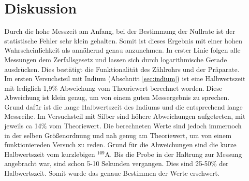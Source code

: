 \section{Diskussion}
\label{sec:Diskussion}
Durch die hohe Messzeit am Anfang, bei der Bestimmung der Nullrate ist der statistische Fehler sehr klein gehalten.
Somit ist dieses Ergebnis mit einer hohen Wahrscheinlichkeit als annähernd genau anzunehmen.
In erster Linie folgen alle Messungen dem Zerfallsgesetz und lassen sich durch logarithmische Gerade ausdrücken.
Dies bestätigt die Funktionalität des Zählrohrs und der Präparate.
Im ersten Versuchsteil mit Indium (Abschnitt \ref{sec:indium}) ist eine Halbwertszeit mit lediglich 1,9\% Abweichung vom Theoriewert berechnet worden.
Diese Abweichung ist klein genug, um von einem guten Messergebnis zu sprechen.
Grund dafür ist die lange Halbwertszeit des Indiums und die entsprechend lange Messreihe.
Im Versuchsteil mit Silber sind höhere Abweichungen aufgetreten, mit jeweils ca 14\% vom Theoriewert.
Die berechneten Werte sind jedoch immernoch in der selben Größenordnung und nah genug am Theoriewert, um von einem funktioniereden Versuch zu reden.
Grund für die Abweichungen sind die kurze Halbwertszeit vom kurzlebigen $^{109}$A.
Bis die Probe in der Haltrung zur Messung angebracht war, sind schon 5-10 Sekunden vergangen.
Dies sind 25-50\% der Halbwertszeit.
Somit wurde das genaue Bestimmen der Werte erschwert.